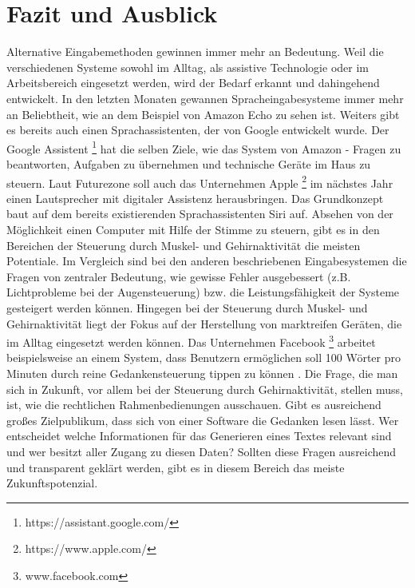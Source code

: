 \chapter{Fazit und Ausblick}

Alternative Eingabemethoden gewinnen immer mehr an Bedeutung. Weil die verschiedenen Systeme sowohl im Alltag, als assistive Technologie oder im Arbeitsbereich eingesetzt werden, wird der Bedarf erkannt und dahingehend entwickelt.
\newline \newline
In den letzten Monaten gewannen Spracheingabesysteme immer mehr an Beliebtheit, wie an dem Beispiel von Amazon Echo zu sehen ist. Weiters gibt es bereits auch einen Sprachassistenten, der von Google entwickelt wurde. Der Google Assistent%
\footnote{https://assistant.google.com/}
%
hat die selben Ziele, wie das System von Amazon - Fragen zu beantworten, Aufgaben zu übernehmen und technische Geräte im Haus zu steuern. Laut Futurezone \cite{Futurezone} soll auch das Unternehmen Apple%
\footnote{https://www.apple.com/}
%
im nächstes Jahr einen Lautsprecher mit digitaler Assistenz herausbringen. Das Grundkonzept baut auf dem bereits existierenden Sprachassistenten Siri auf.
\newline \newline
Absehen von der Möglichkeit einen Computer mit Hilfe der Stimme zu steuern, gibt es in den Bereichen der Steuerung durch Muskel- und Gehirnaktivität die meisten Potentiale. Im Vergleich sind bei den anderen beschriebenen Eingabesystemen die Fragen von zentraler Bedeutung, wie gewisse Fehler ausgebessert (z.B. Lichtprobleme bei der Augensteuerung) bzw. die Leistungsfähigkeit der Systeme gesteigert werden können. Hingegen bei der Steuerung durch Muskel- und Gehirnaktivität liegt der Fokus auf der Herstellung von marktreifen Geräten, die im Alltag eingesetzt werden können. Das Unternehmen Facebook%
\footnote{www.facebook.com}
%
arbeitet beispielsweise an einem System, dass Benutzern ermöglichen soll 100 Wörter pro Minuten durch reine Gedankensteuerung tippen zu können \cite{Facebook}.
\newline \newline
Die Frage, die man sich in Zukunft, vor allem bei der Steuerung durch Gehirnaktivität, stellen muss, ist, wie die rechtlichen Rahmenbedienungen ausschauen. Gibt es ausreichend großes Zielpublikum, dass sich von einer Software die Gedanken lesen lässt. Wer entscheidet welche Informationen für das Generieren eines Textes relevant sind und wer besitzt aller Zugang zu diesen Daten? Sollten diese Fragen ausreichend und transparent geklärt werden, gibt es in diesem Bereich das meiste Zukunftspotenzial.



